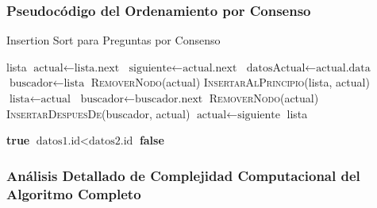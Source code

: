 \documentclass[11pt,a4paper]{article}
\begin{document}
\subsubsection{Pseudocódigo del Ordenamiento por Consenso}

\begin{algorithm}[H]
\caption{Insertion Sort para Preguntas por Consenso}
\begin{algorithmic}[1]
        \State \Return lista
    \EndIf
    \State $\text{actual} \leftarrow \text{lista.next}$
        \State $\text{siguiente} \leftarrow \text{actual.next}$
        \State $\text{datosActual} \leftarrow \text{actual.data}$
        \State $\text{buscador} \leftarrow \text{lista}$
            \State \textsc{RemoverNodo}(actual)
            \State \textsc{InsertarAlPrincipio}(lista, actual)
            \State $\text{lista} \leftarrow \text{actual}$
        \Else
                \State $\text{buscador} \leftarrow \text{buscador.next}$
            \EndWhile
                \State \textsc{RemoverNodo}(actual)
                \State \textsc{InsertarDespuesDe}(buscador, actual)
            \EndIf
        \EndIf
        \State $\text{actual} \leftarrow \text{siguiente}$
    \EndWhile
    \State \Return lista
\EndProcedure

     
        \State \Return \textbf{true}
        \State \Return $\text{datos1.id} < \text{datos2.id}$ 
    \Else
        \State \Return \textbf{false}
    \EndIf
\EndProcedure
\end{algorithmic}
\end{algorithm}

\subsubsection{Análisis Detallado de Complejidad Computacional del Algoritmo Completo}
\end{document}

